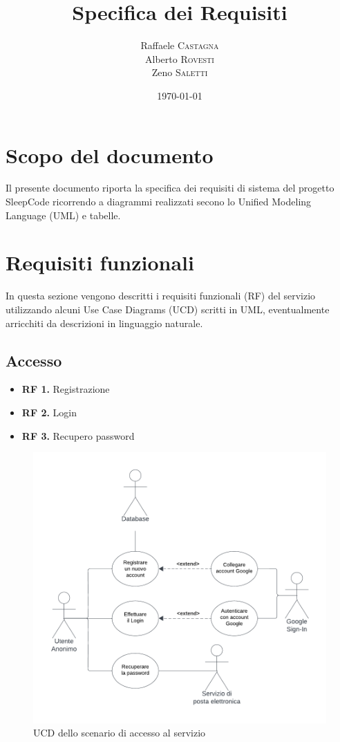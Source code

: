\documentclass[11pt, a4paper]{article}
\title{Specifica dei Requisiti}
\author{Raffaele \textsc{Castagna}\\
Alberto \textsc{Rovesti}\\
Zeno \textsc{Saletti}}
\date{\today}
\theoremstyle{definition}
\begin{document}


\tableofcontents

\newpage

\section*{Scopo del documento}
Il presente documento riporta la specifica dei requisiti di sistema
del progetto SleepCode ricorrendo a diagrammi realizzati secono lo
Unified Modeling Language (UML) e tabelle.

\section{Requisiti funzionali}
In questa sezione vengono descritti i requisiti funzionali (RF) del
servizio utilizzando alcuni Use Case Diagrams (UCD) scritti in UML,
eventualmente arricchiti da descrizioni in linguaggio naturale.


\subsection{Accesso}
\begin{itemize}
    \item \textbf{RF 1.} Registrazione
    \item \textbf{RF 2.} Login
    \item \textbf{RF 3.} Recupero password
\end{itemize}

\begin{figure}[H]
\centering
\includegraphics[scale=0.6]{materiale/accesso.pdf}
\caption{UCD dello scenario di accesso al servizio}
\end{figure}
\end{document}
